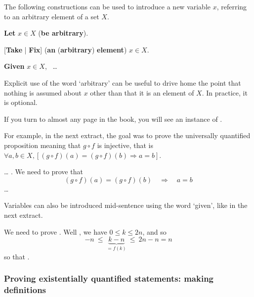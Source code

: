 \begin{vocabulary}
\label{vcbIntroducingVariable}
The following constructions can be used to introduce a new variable $x$, referring to an arbitrary element of a set $X$.

\begin{vocabtemplate}
\textbf{Let} $x \in X$ (\textbf{be arbitrary}).

\vtor

[\textbf{Take} | \textbf{Fix}] (\textbf{an} (\textbf{arbitrary}) \textbf{element}) $x \in X$.

\vtor

\textbf{Given} $x \in X$, ~\dots{}
\end{vocabtemplate}

Explicit use of the word `arbitrary' can be useful to drive home the point that nothing is assumed about $x$ other than that it is an element of $X$. In practice, it is optional.
\end{vocabulary}

If you turn to almost any page in the book, you will see an instance of .

For example, in the next extract, the goal was to prove the universally quantified proposition meaning that $g \circ f$ is injective, that is $\forall a,b \in X,[(g \circ f)(a) = (g \circ f)(b) \Rightarrow a=b]$.

\begin{extract}
\label{xtrVariableIntroductionExample}
\dots{} .
We need to prove that
\[ (g \circ f)(a) = (g \circ f)(b) \quad \Rightarrow \quad a=b \]
\dots{}
\end{extract}

Variables can also be introduced mid-sentence using the word `given', like in the next extract.

\begin{extract}
\label{xtrIntroducingVariableExampleTwo}
We need to prove . Well , we have $0 \le k \le 2n$, and so
\[ -n ~ \le ~ \underbrace{k-n}_{=f(k)} ~ \le ~ 2n - n = n \]
so that .
\end{extract}

\subsubsection*{Proving existentially quantified statements: making definitions}

